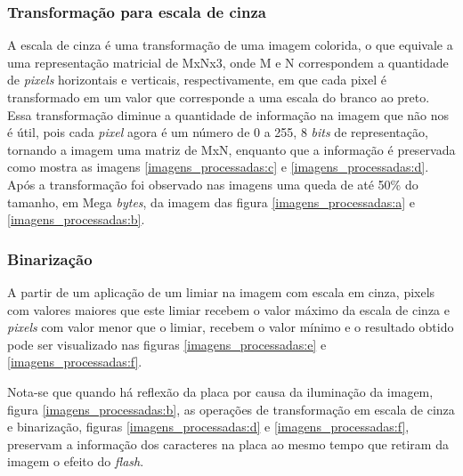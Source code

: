 \subsubsection{Transformação para escala de cinza}
A escala de cinza é uma transformação de uma imagem colorida, o que equivale a uma representação matricial de MxNx3, onde M e N correspondem a quantidade de \emph{pixels} horizontais e verticais, respectivamente, em que cada pixel é transformado em um valor que corresponde a uma escala do branco ao preto. Essa transformação diminue a quantidade de informação na imagem que não nos é útil, pois cada \emph{pixel} agora é um número de 0 a 255, 8 \emph{bits} de representação, tornando a imagem uma matriz de MxN, enquanto que a informação é preservada como mostra as imagens \ref{imagens_processadas:c} e \ref{imagens_processadas:d}. Após a transformação foi observado nas imagens uma queda de até 50\% do tamanho, em Mega \emph{bytes}, da imagem das figura \ref{imagens_processadas:a} e \ref{imagens_processadas:b}.

\subsubsection{Binarização}
A partir de um aplicação de um limiar na imagem com escala em cinza, pixels com valores maiores que este limiar recebem o valor máximo da escala de cinza e \emph{pixels} com valor menor que o limiar, recebem o valor mínimo e o resultado obtido  pode ser visualizado nas figuras \ref{imagens_processadas:e} e \ref{imagens_processadas:f}.

Nota-se que quando há reflexão da placa por causa da iluminação da imagem, figura \ref{imagens_processadas:b}, as operações de transformação em escala de cinza e binarização, figuras \ref{imagens_processadas:d} e \ref{imagens_processadas:f}, preservam a informação dos caracteres na placa ao mesmo tempo que retiram da imagem o efeito do \emph{flash}.




